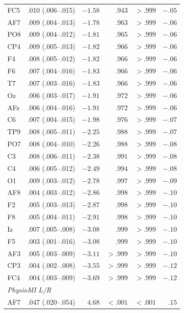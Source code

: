 {\begin{longtable}{llrrrr}
FC5 & .010 (.006--.015) & $-1.58$ & $.943$ & $> .999$ & $-.05$ \\
AF7 & .009 (.004--.013) & $-1.78$ & $.963$ & $> .999$ & $-.06$ \\
PO8 & .009 (.004--.012) & $-1.81$ & $.965$ & $> .999$ & $-.06$ \\
CP4 & .009 (.005--.013) & $-1.82$ & $.966$ & $> .999$ & $-.06$ \\
F4 & .008 (.005--.012) & $-1.82$ & $.966$ & $> .999$ & $-.06$ \\
F6 & .007 (.004--.016) & $-1.83$ & $.966$ & $> .999$ & $-.06$ \\
T7 & .007 (.003--.016) & $-1.83$ & $.966$ & $> .999$ & $-.06$ \\
Oz & .006 (.003--.017) & $-1.91$ & $.972$ & $> .999$ & $-.06$ \\
AFz & .006 (.004--.016) & $-1.91$ & $.972$ & $> .999$ & $-.06$ \\
C6 & .007 (.004--.015) & $-1.98$ & $.976$ & $> .999$ & $-.07$ \\
TP9 & .008 (.005--.011) & $-2.25$ & $.988$ & $> .999$ & $-.07$ \\
PO7 & .008 (.004--.010) & $-2.26$ & $.988$ & $> .999$ & $-.08$ \\
C3 & .008 (.006--.011) & $-2.38$ & $.991$ & $> .999$ & $-.08$ \\
C4 & .006 (.005--.012) & $-2.49$ & $.994$ & $> .999$ & $-.08$ \\
O1 & .009 (.003--.012) & $-2.78$ & $.997$ & $> .999$ & $-.09$ \\
AF8 & .004 (.003--.012) & $-2.86$ & $.998$ & $> .999$ & $-.10$ \\
F2 & .005 (.003--.013) & $-2.87$ & $.998$ & $> .999$ & $-.10$ \\
F8 & .005 (.004--.011) & $-2.91$ & $.998$ & $> .999$ & $-.10$ \\
Iz & .007 (.005--.008) & $-3.08$ & $.999$ & $> .999$ & $-.10$ \\
F5 & .003 (.001--.016) & $-3.08$ & $.999$ & $> .999$ & $-.10$ \\
AF3 & .005 (.003--.009) & $-3.11$ & $> .999$ & $> .999$ & $-.10$ \\
CP3 & .004 (.002--.008) & $-3.55$ & $> .999$ & $> .999$ & $-.12$ \\
FC4 & .004 (.003--.009) & $-3.69$ & $> .999$ & $> .999$ & $-.12$ \\
\midrule \multicolumn{6}{l}{\textit{PhysioMI L/R}} \\
AF7 & .047 (.020--.054) & $4.68$ & $< .001$ & $< .001$ & $.15$ \\

\end{longtable}}
